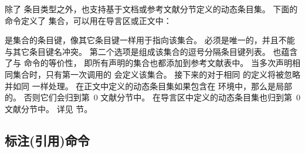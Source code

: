 除了  条目类型之外，\biblatex 也支持基于文档或参考文献分节定义的动态条目集。
下面的命令定义了  集合，可以用在导言区或正文中：

\begin{ltxsyntax}



 是集合的条目键，像其它条目键一样用于指向该集合。
 必须是唯一的，并且不能与其它条目键名冲突。
第二个选项是组成该集合的逗号分隔条目键列表。
 也蕴含了与  命令的等价性，
即所有声明的集合也都添加到参考文献表中。
当多次声明相同集合时，只有第一次调用的  会定义该集合。
接下来的对于相同  的定义将被忽略并如同  一样处理。
在正文中定义的动态条目集如果包含在  环境中，那么是局部的。
否则它们会归到第~0 文献分节中。
在导言区中定义的动态条目集也归到第~0 文献分节中。
详见  节。

\end{ltxsyntax}

\subsection{标注(引用)命令}%
\label{use:cit}



